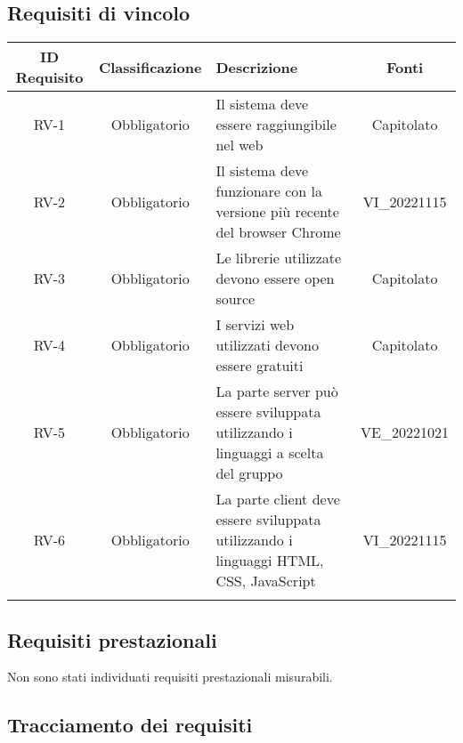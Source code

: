 \subsection{Requisiti di vincolo}
\renewcommand\tabularxcolumn[1]{>{\Centering}m{#1}}
\begin{tabularx}{\textwidth}{| c | c | X | c |} 
 \hline
 \textbf{ID Requisito} & \textbf{Classificazione} & \textbf{Descrizione} & \textbf{Fonti} \\
 \hline
 RV-1 & Obbligatorio &  Il sistema deve essere raggiungibile nel web & Capitolato\\
 \hline
  RV-2 & Obbligatorio & Il sistema deve funzionare con la versione più recente del browser Chrome & VI\_20221115\\
 \hline
 RV-3 & Obbligatorio &  Le librerie utilizzate devono essere open source & Capitolato\\
 \hline
 RV-4 & Obbligatorio & I servizi web utilizzati devono essere gratuiti &  Capitolato\\
 \hline
 RV-5 & Obbligatorio & La parte server può essere sviluppata utilizzando i linguaggi a scelta del gruppo & VE\_20221021\\
 \hline
 RV-6 & Obbligatorio & La parte client deve essere sviluppata utilizzando i linguaggi HTML, CSS, JavaScript & VI\_20221115\\
 \hline
\caption{Requisiti di vincolo}
\end{tabularx}

\subsection{Requisiti prestazionali}
Non sono stati individuati requisiti prestazionali misurabili.

\subsection{Tracciamento dei requisiti}

